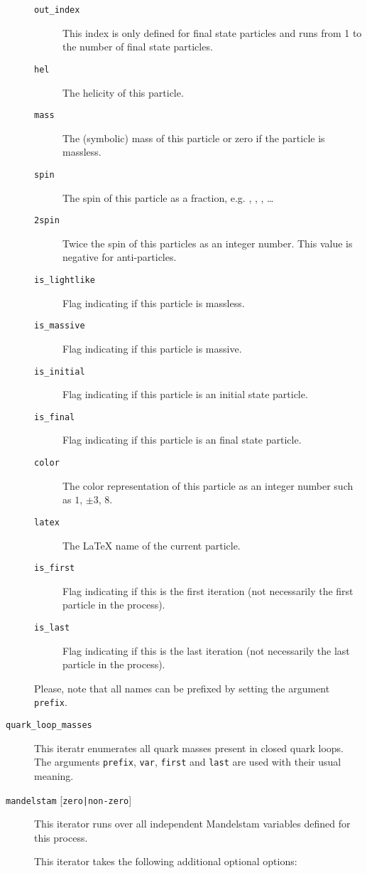 \documentclass[11pt,a4paper]{refrep}
\begin{document}
\begin{description}
\begin{description}
   \item[\texttt{out\_index}] This index is only defined for final state
       particles and runs from 1 to the number of final state particles.
   \item[\texttt{hel}] The helicity of this particle.
   \item[\texttt{mass}] The (symbolic) mass of this particle or zero
       if the particle is massless.
   \item[\texttt{spin}] The spin of this particle as a fraction, e.g.
      , , , \dots
   \item[\texttt{2spin}] Twice the spin of this particles as an integer
      number. This value is negative for anti-particles.
   \item[\texttt{is\_lightlike}] Flag indicating if this particle is massless.
   \item[\texttt{is\_massive}] Flag indicating if this particle is massive.
   \item[\texttt{is\_initial}] Flag indicating if this particle is an
      initial state particle.
   \item[\texttt{is\_final}] Flag indicating if this particle is an
      final state particle.
   \item[\texttt{color}] The color representation of this particle
      as an integer number such as $1$, $\pm3$, $8$.
   \item[\texttt{latex}] The \LaTeX{} name of the current particle.
   \item[\texttt{is\_first}] Flag indicating if this is the first
      iteration (not necessarily the first particle in the process).
   \item[\texttt{is\_last}] Flag indicating if this is the last
      iteration (not necessarily the last particle in the process).
   \end{description}

   Please, note that all names can be prefixed by setting the argument
   \texttt{prefix}.
\item[\texttt{quark\_loop\_masses}] This iteratr enumerates all
   quark masses present in closed quark loops. The arguments
   \texttt{prefix}, \texttt{var}, \texttt{first} and \texttt{last}
   are used with their usual meaning.
\item[\texttt{mandelstam}
   {[\texttt{zero|non-zero}]}]
   This iterator runs over all independent Mandelstam variables defined
   for this process.

   This iterator takes the following additional optional options:
   \smallskip


\end{description}
\end{document}
